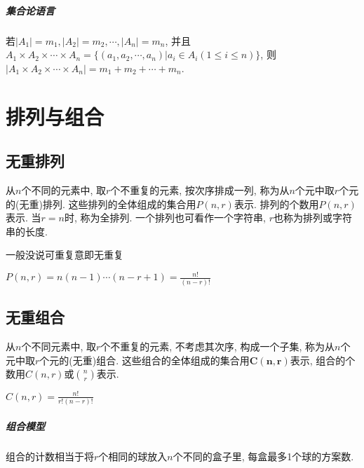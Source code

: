         \subparagraph{集合论语言}

            若$|A_1|=m_1, |A_2|=m_2, \cdots, |A_n|=m_n$, 并且$A_1\times A_2\times \cdots \times A_n=\{(a_1,a_2,\cdots,a_n)|a_i\in A_i(1\leqslant i\leqslant n)\}$, 则$|A_1\times A_2\times\cdots\times A_n|=m_1+m_2+\cdots+m_n$.

\section{排列与组合}

    \subsection{无重排列}

        \begin{definition}[无重排列]
            从$n$个不同的元素中, 取$r$个不重复的元素, 按次序排成一列, 称为从$n$个元中取$r$个元的\textsf{(无重)排列}. 这些排列的全体组成的集合用$P(n,r)$表示. 排列的个数用$P(n,r)$表示. 当$r=n$时, 称为\textsf{全排列}. 一个排列也可看作一个字符串, $r$也称为排列或字符串的长度. 
        \end{definition}

        \begin{caution}
            一般没说可重复意即无重复
        \end{caution}

        \begin{theorem}
            $P(n,r)=n(n-1)\cdots(n-r+1)=\frac{n!}{(n-r)!}$
        \end{theorem}

    \subsection{无重组合}

        \begin{definition}[无重组合]
            从$n$个不同元素中, 取$r$个不重复的元素, 不考虑其次序, 构成一个子集, 称为从$n$个元中取$r$个元的\textsf{(无重)组合}. 这些组合的全体组成的集合用$\mathbf{C(n,r)}$表示, 组合的个数用$C(n,r)$或$n\choose r$表示.
        \end{definition}
        \begin{theorem}
            $C(n,r)=\frac{n!}{r!(n-r)!}$
        \end{theorem}

        \subparagraph{组合模型}

            组合的计数相当于将$r$个相同的球放入$n$个不同的盒子里, 每盒最多1个球的方案数.

